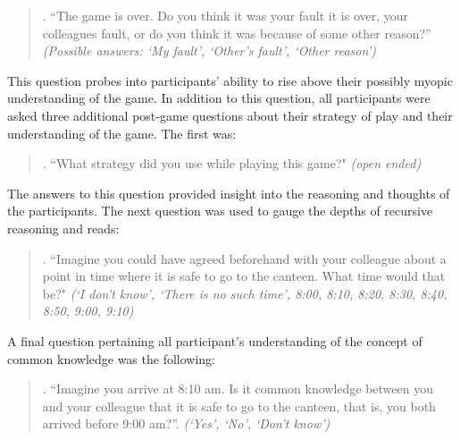 \begin{quote}
. ``The game is over. Do you think it was your fault it is over, your colleagues fault, or do
you think it was because of some other reason?'' \textit{(Possible answers: `My fault', `Other's fault', `Other reason')}
\end{quote}
This question probes into participants' ability to rise above their possibly myopic understanding of the game. In addition to this question, all participants were asked three additional post-game questions about their strategy of play and their understanding of the game. The first was:
\begin{quote}
. ``What strategy did you use while playing this game?" \textit{(open ended)}
\end{quote}
The answers to this question provided insight into the reasoning and thoughts of the participants. The next question was used to gauge the depths of recursive reasoning and reads:
\begin{quote}
. ``Imagine you could have agreed beforehand with your colleague about a point in time where it is safe to go to the canteen. What time would that be?" \textit{(`I don't know', `There is no such time', 8:00, 8:10, 8:20, 8:30, 8:40, 8:50, 9:00, 9:10)}
\end{quote}
A final question pertaining all participant's understanding of the concept of common knowledge was the following:
\begin{quote}
. ``Imagine you arrive at 8:10 am. Is it common knowledge between you and your colleague that it is safe to go to the canteen, that is, you both arrived before 9:00 am?''. \textit{(`Yes', `No', `Don't know')}
\end{quote}



